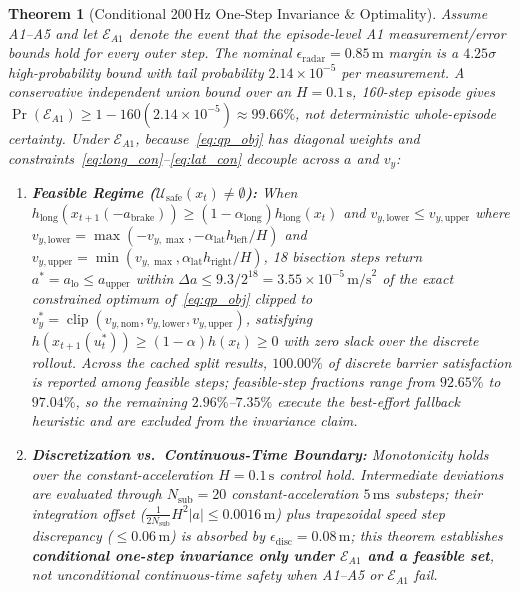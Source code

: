 \documentclass[journal]{IEEEtran}
\newtheorem{theorem}{Theorem}
\begin{document}
\begin{theorem}[Conditional 200\,Hz One-Step Invariance \& Optimality]
Assume A1--A5 and let $\mathcal{E}_{A1}$ denote the event that the episode-level A1 measurement/error bounds hold for every outer step. The nominal $\epsilon_{\text{radar}}=0.85\,\text{m}$ margin is a $4.25\sigma$ high-probability bound with tail probability $2.14\times10^{-5}$ per measurement. A conservative independent union bound over an $H=0.1\,\text{s}$, 160-step episode gives $\Pr(\mathcal{E}_{A1})\ge 1-160(2.14\times10^{-5})\approx99.66\%$, not deterministic whole-episode certainty. Under $\mathcal{E}_{A1}$, because~\eqref{eq:qp_obj} has diagonal weights and constraints~\eqref{eq:long_con}--\eqref{eq:lat_con} decouple across $a$ and $v_y$:
\begin{enumerate}
    \item \textbf{Feasible Regime ($\mathcal{U}_{\text{safe}}(x_t) \neq \emptyset$):} When $h_{\text{long}}(x_{t+1}(-a_{\text{brake}})) \ge (1-\alpha_{\text{long}})h_{\text{long}}(x_t)$ and $v_{y,\text{lower}} \le v_{y,\text{upper}}$ where $v_{y,\text{lower}}=\max(-v_{y,\max}, -\alpha_{\text{lat}}h_{\text{left}}/H)$ and $v_{y,\text{upper}}=\min(v_{y,\max}, \alpha_{\text{lat}}h_{\text{right}}/H)$, 18 bisection steps return $a^* = a_{\text{lo}} \le a_{\text{upper}}$ within $\Delta a \le 9.3/2^{18} = 3.55\times 10^{-5}\,\text{m/s}^2$ of the exact constrained optimum of~\eqref{eq:qp_obj} clipped to $v_y^* = \operatorname{clip}(v_{y,\text{nom}}, v_{y,\text{lower}}, v_{y,\text{upper}})$, satisfying $h(x_{t+1}(u_t^*)) \ge (1-\alpha)h(x_t) \ge 0$ with zero slack over the discrete rollout. Across the cached split results, $100.00\%$ of discrete barrier satisfaction is reported among feasible steps; feasible-step fractions range from $92.65\%$ to $97.04\%$, so the remaining $2.96\%$--$7.35\%$ execute the best-effort fallback heuristic and are excluded from the invariance claim.
    \item \textbf{Discretization vs.\ Continuous-Time Boundary:} Monotonicity holds over the constant-acceleration $H=0.1\,\text{s}$ control hold. Intermediate deviations are evaluated through $N_{\text{sub}}=20$ constant-acceleration $5\,\text{ms}$ substeps; their integration offset ($\frac{1}{2N_{\text{sub}}}H^2|a| \le 0.0016\,\text{m}$) plus trapezoidal speed step discrepancy ($\le 0.06\,\text{m}$) is absorbed by $\epsilon_{\text{disc}} = 0.08\,\text{m}$; this theorem establishes \textbf{conditional one-step invariance only under $\mathcal{E}_{A1}$ and a feasible set}, not unconditional continuous-time safety when A1--A5 or $\mathcal{E}_{A1}$ fail.

\end{enumerate}
\end{theorem}
\end{document}
